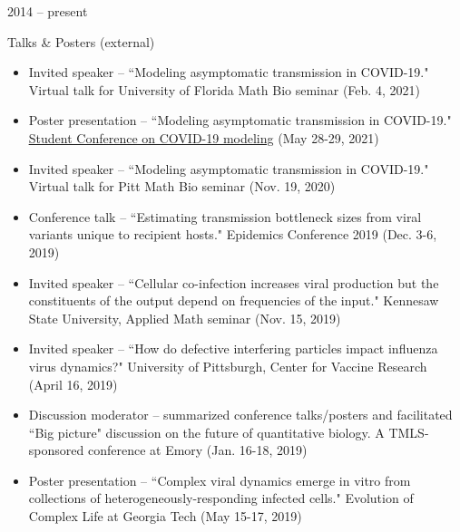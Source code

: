 \documentclass[a4paper,10pt]{article}
\newlength{\cvcolumngapwidth}
\newlength{\cvleftcolumnwidth}
\newlength{\cvrightcolumnwidth}
\newcommand{\cvtitlestyle}[1]{{\large\cvtitlefont\textcolor{cvtitlecolor}{#1}}}
\newcommand{\cvheadingstyle}[1]{{\normalsize\cvheadingfont\textcolor{cvheadingcolor}{#1}}}
\newlength{\cvafteritemskipamount}
\newlength{\cvaftertitleskipamount}
\newlength{\cvparskip}
\newcommand{\cvitem}[2]{
    \begin{minipage}[t]{\cvleftcolumnwidth}
        \raggedleft #1
    \end{minipage}%
    \hspace{\cvcolumngapwidth}%
    \begin{minipage}[t]{\cvrightcolumnwidth}
        \setlength{\parskip}{\cvparskip} #2
    \end{minipage}

    \vspace{\cvafteritemskipamount}
}
\newcommand{\cvtitle}[1]{
    \cvtitlestyle{#1}

    \vspace{\cvaftertitleskipamount}
    \vspace{-\cvparskip}
}
\begin{document}
\cvitem{
    \cvheadingstyle{2014 -- present}
}{

    \cvtitle{Talks \& Posters (external)}
    \begin{itemize}[leftmargin=*]
        	\item Invited speaker -- ``Modeling asymptomatic transmission in COVID-19." Virtual talk for University of Florida Math Bio seminar (Feb. 4, 2021) \\
	\item Poster presentation -- ``Modeling asymptomatic transmission in COVID-19."  \href{https://sites.google.com/view/nsfstudentconference2021/home}{\underline{Student Conference on COVID-19 modeling}}  (May 28-29, 2021) \\
    	\item Invited speaker -- ``Modeling asymptomatic transmission in COVID-19." Virtual talk for Pitt Math Bio seminar (Nov. 19, 2020) \\
    	\item Conference talk -- ``Estimating transmission bottleneck sizes from viral variants unique to recipient hosts." Epidemics Conference 2019 (Dec. 3-6, 2019) \\
        \item Invited speaker -- ``Cellular co-infection increases viral production but the constituents of the output depend on frequencies of the input." Kennesaw State University, Applied 	Math seminar (Nov. 15, 2019) \\
       	\item Invited speaker -- ``How do defective interfering particles impact influenza virus dynamics?" University of Pittsburgh, Center for Vaccine Research (April 16, 2019) \\
        \item Discussion moderator -- summarized conference talks/posters and facilitated ``Big picture" discussion on the future of quantitative biology. A TMLS-sponsored conference at Emory (Jan. 16-18, 2019) \\

        \item Poster presentation -- ``Complex viral dynamics emerge in vitro from collections of heterogeneously-responding infected cells." Evolution of Complex Life at Georgia Tech (May 15-17, 2019) \\
    \end{itemize}
    
}
\end{document}
